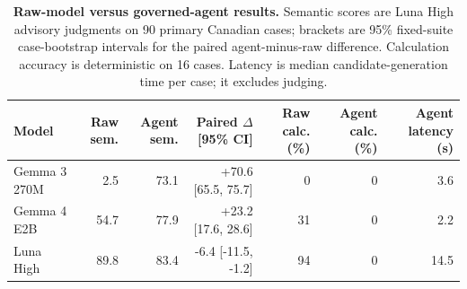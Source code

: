 \begin{table}[t]
  \centering
  \caption{\textbf{Raw-model versus governed-agent results.} Semantic scores are Luna High advisory judgments on 90 primary Canadian cases; brackets are 95\% fixed-suite case-bootstrap intervals for the paired agent-minus-raw difference. Calculation accuracy is deterministic on 16 cases. Latency is median candidate-generation time per case; it excludes judging.}
  \label{tab:benchmark}
  \small
  \begin{tabular}{lrrrrrr}
    \toprule
    Model & Raw sem. & Agent sem. & Paired $\Delta$ [95\% CI] & Raw calc. (\%) & Agent calc. (\%) & Agent latency (s) \\
    \midrule
Gemma 3 270M & 2.5 & 73.1 & +70.6 [65.5, 75.7] & 0 & 0 & 3.6 \\
Gemma 4 E2B & 54.7 & 77.9 & +23.2 [17.6, 28.6] & 31 & 0 & 2.2 \\
Luna High & 89.8 & 83.4 & -6.4 [-11.5, -1.2] & 94 & 0 & 14.5 \\
    \bottomrule
  \end{tabular}
\end{table}
